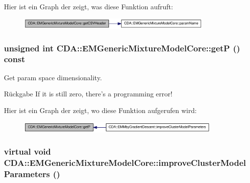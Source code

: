 Hier ist ein Graph der zeigt, was diese Funktion aufruft:\nopagebreak
\begin{figure}[H]
\begin{center}
\leavevmode
\includegraphics[width=274pt]{classCDA_1_1EMGenericMixtureModelCore_a10bd69fd4b420a274aee5f10e09ed5fe_cgraph}
\end{center}
\end{figure}


\hypertarget{classCDA_1_1EMGenericMixtureModelCore_a8cc9f7feff2bc07e5e493a3ef7e01ceb}{
\subsubsection[{getP}]{\setlength{\rightskip}{0pt plus 5cm}unsigned int CDA::EMGenericMixtureModelCore::getP () const}}
\label{classCDA_1_1EMGenericMixtureModelCore_a8cc9f7feff2bc07e5e493a3ef7e01ceb}


Get param space dimensionality. 

\begin{DoxyReturn}{Rückgabe}
If it is still zero, there's a programming error! 
\end{DoxyReturn}


Hier ist ein Graph der zeigt, wo diese Funktion aufgerufen wird:\nopagebreak
\begin{figure}[H]
\begin{center}
\leavevmode
\includegraphics[width=286pt]{classCDA_1_1EMGenericMixtureModelCore_a8cc9f7feff2bc07e5e493a3ef7e01ceb_icgraph}
\end{center}
\end{figure}


\hypertarget{classCDA_1_1EMGenericMixtureModelCore_a5a7545c679b386086bf3776315e26435}{
\subsubsection[{improveClusterModelParameters}]{\setlength{\rightskip}{0pt plus 5cm}virtual void CDA::EMGenericMixtureModelCore::improveClusterModelParameters ()}}
\label{classCDA_1_1EMGenericMixtureModelCore_a5a7545c679b386086bf3776315e26435}


